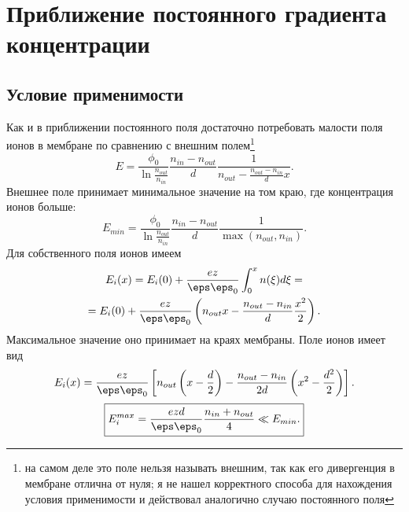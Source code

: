 \documentclass{hedwork}
\begin{document}
\section{Приближение постоянного градиента концентрации}
\subsection{Условие применимости}
    Как и в приближении постоянного поля достаточно потребовать малости поля
    ионов в мембране по сравнению с внешним полем\footnote{на самом деле это
    поле нельзя называть внешним, так как его дивергенция в мембране отлична от
    нуля; я не нашел корректного способа для нахождения условия применимости и
    действовал аналогично случаю постоянного поля}
    \[
        E = \frac{\phi_0}{\ln\frac{n_{out}}{n_{in}}}
            \frac{n_{in} - n_{out}}{d}
            \frac{1}{n_{out} - \frac{n_{out} - n_{in}}{d} x}.
    \]
    Внешнее поле принимает минимальное значение на том краю, где концентрация
    ионов больше:
    \[
        E_{min} = \frac{\phi_0}{\ln\frac{n_{out}}{n_{in}}}
            \frac{n_{in} - n_{out}}{d}\frac{1}{\max(n_{out}, n_{in})}.
    \]
    Для собственного поля ионов имеем
    \begin{gather}
        E_i(x) = E_i(0) + \frac{ez}{\eps\eps_0}\int_0^x n(\xi)d\xi = \nonumber\\
        = E_i(0) + \frac{ez}{\eps\eps_0}\left(
        n_{out} x - \frac{n_{out} - n_{in}}{d}\frac{x^2}{2}\right).
    \end{gather}
    Максимальное значение оно принимает на краях мембраны. Поле ионов имеет вид
    \begin{equation}
        E_i(x) = \frac{ez}{\eps\eps_0}\left[
        n_{out} \left(x-\frac{d}{2}\right) - \frac{n_{out} - n_{in}}{2d}
        \left(x^2 - \frac{d^2}{2}\right)
        \right].
    \end{equation}
    \begin{equation}
        \boxed{
        E_i^{max} = \frac{ezd}{\eps\eps_0}\frac{n_{in}+n_{out}}{4} \ll E_{min}.}
    \end{equation}
\end{document}
